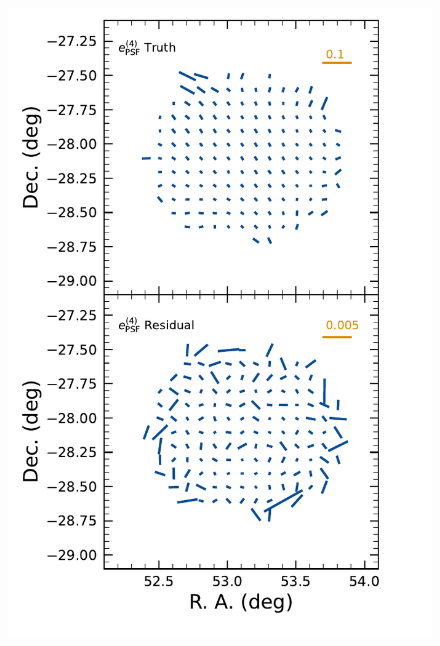 \begin{figure}[htb!]
    \centering
    \includegraphics[scale=0.33]{psf_fourth_whisker}

\end{figure}
